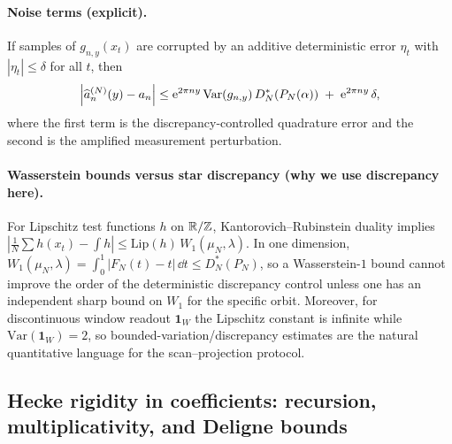 \paragraph{Noise terms (explicit).}
If samples of $g_{n,y}(x_t)$ are corrupted by an additive deterministic error $\eta_t$ with $|\eta_t|\le \delta$ for all $t$, then
\begin{equation}
\left|\widehat a_n^{(N)}(y)-a_n\right|
\le
\mathrm{e}^{2\pi n y}\,\mathrm{Var}(g_{n,y})\,D_N^\ast\!\left(P_N(\alpha)\right)
\;+\;\mathrm{e}^{2\pi n y}\,\delta,
\label{eq:coeff_recovery_with_noise}
\end{equation}
where the first term is the discrepancy-controlled quadrature error and the second is the amplified measurement perturbation.

\paragraph{Wasserstein bounds versus star discrepancy (why we use discrepancy here).}
For Lipschitz test functions $h$ on $\mathbb{R}/\mathbb{Z}$, Kantorovich--Rubinstein duality implies $|\frac{1}{N}\sum h(x_t)-\int h|\le \mathrm{Lip}(h)\,W_1(\mu_N,\lambda)$. In one dimension, $W_1(\mu_N,\lambda)=\int_0^1 |F_N(t)-t|\,\dd t\le D_N^\ast(P_N)$, so a Wasserstein-$1$ bound cannot improve the order of the deterministic discrepancy control unless one has an independent sharp bound on $W_1$ for the specific orbit. Moreover, for discontinuous window readout $\mathbf{1}_W$ the Lipschitz constant is infinite while $\mathrm{Var}(\mathbf{1}_W)=2$, so bounded-variation/discrepancy estimates are the natural quantitative language for the scan--projection protocol.

\subsection{Hecke rigidity in coefficients: recursion, multiplicativity, and Deligne bounds}
\label{sec:quant_hecke_tau}

